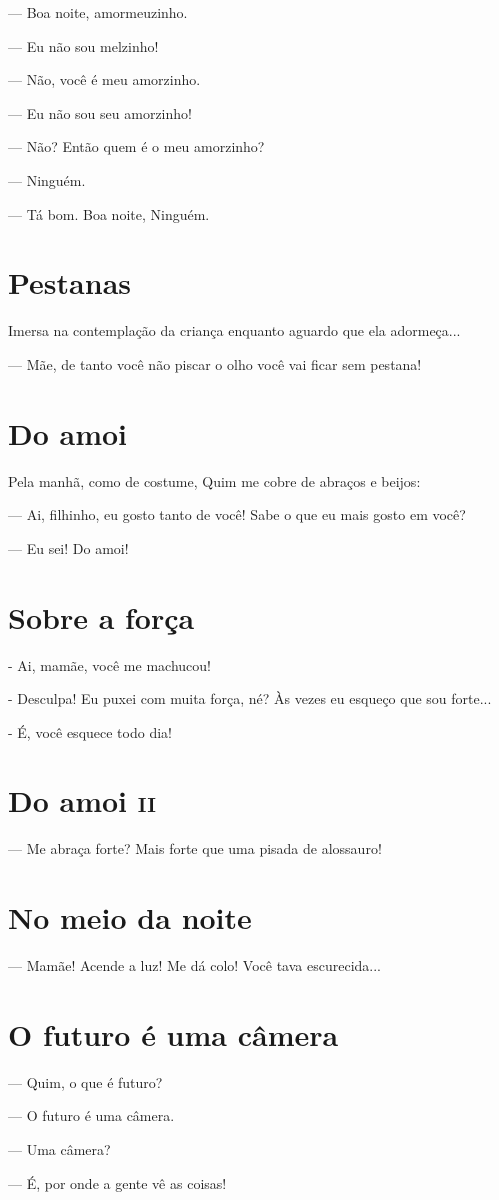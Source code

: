 {\parindent0pt\parskip1pt\raggedright
--- Boa noite, amormeuzinho.

--- Eu não sou melzinho!

--- Não, você é meu amorzinho.

--- Eu não sou seu amorzinho!

--- Não? Então quem é o meu amorzinho?

--- Ninguém.

--- Tá bom. Boa noite, Ninguém.

\chapter{Pestanas}\label{pestanas}

Imersa na contemplação da criança enquanto aguardo que ela adormeça...

--- Mãe, de tanto você não piscar o olho você vai ficar sem pestana!

\chapter{Do amoi}\label{do-amoi}

Pela manhã, como de costume, Quim me cobre de abraços e beijos:

--- Ai, filhinho, eu gosto tanto de você! Sabe o que eu mais gosto em
você?

--- Eu sei! Do amoi!

\chapter{Sobre a força}

- Ai, mamãe, você me machucou!

- Desculpa! Eu puxei com muita força, né? Às vezes eu esqueço que sou
forte...

- É, você esquece todo dia!}

\chapter{Do amoi \textsc{ii}}

{\parindent0pt\parskip1pt\raggedright
--- Me abraça forte? Mais forte que uma pisada de alossauro!

\chapter{No meio da noite}\label{no-meio-da-noite}

--- Mamãe! Acende a luz! Me dá colo! Você tava escurecida...

\chapter{O futuro é uma câmera}\label{o-futuro-uxe9-uma-cuxe2mera}

--- Quim, o que é futuro?

--- O futuro é uma câmera.

--- Uma câmera?

--- É, por onde a gente vê as coisas!}

